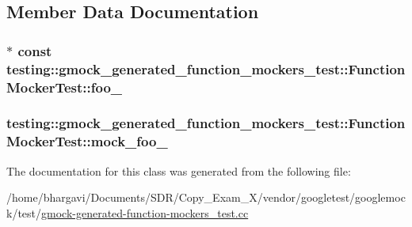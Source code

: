 \subsection{Member Data Documentation}
\subsubsection[{\texorpdfstring{foo\+\_\+}{foo_}}]{$\ast$ const testing\+::gmock\+\_\+generated\+\_\+function\+\_\+mockers\+\_\+test\+::\+Function\+Mocker\+Test\+::foo\+\_\+\hspace{0.3cm}{\ttfamily [protected]}}\hypertarget{classtesting_1_1gmock__generated__function__mockers__test_1_1_function_mocker_test_ae2b8b577c4808f2dff9797168468f65f}{}\label{classtesting_1_1gmock__generated__function__mockers__test_1_1_function_mocker_test_ae2b8b577c4808f2dff9797168468f65f}
\subsubsection[{\texorpdfstring{mock\+\_\+foo\+\_\+}{mock_foo_}}]{ testing\+::gmock\+\_\+generated\+\_\+function\+\_\+mockers\+\_\+test\+::\+Function\+Mocker\+Test\+::mock\+\_\+foo\+\_\+\hspace{0.3cm}{\ttfamily [protected]}}\hypertarget{classtesting_1_1gmock__generated__function__mockers__test_1_1_function_mocker_test_a265659f07a0e75152ab295add4769585}{}\label{classtesting_1_1gmock__generated__function__mockers__test_1_1_function_mocker_test_a265659f07a0e75152ab295add4769585}


The documentation for this class was generated from the following file\+:\begin{DoxyCompactItemize}
\item 
/home/bhargavi/\+Documents/\+S\+D\+R/\+Copy\+\_\+\+Exam\+\_\+X/vendor/googletest/googlemock/test/\hyperlink{gmock-generated-function-mockers__test_8cc}{gmock-\/generated-\/function-\/mockers\+\_\+test.\+cc}\end{DoxyCompactItemize}
